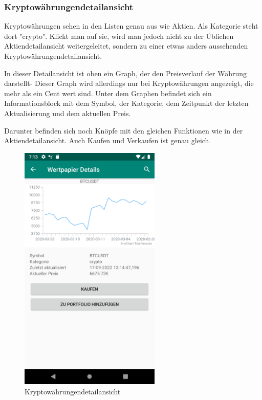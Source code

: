 \documentclass[10pt]{scrartcl}
\begin{document}
\subsubsection{Kryptowährungendetailansicht}

Kryptowährungen sehen in den Listen genau aus wie Aktien. Als Kategorie steht dort "crypto". Klickt man auf sie, wird man jedoch nicht zu der Üblichen Aktiendetailansicht weitergeleitet, sondern zu einer etwas anders aussehenden Kryptowährungendetailansicht.

In dieser Detailansicht ist oben ein Graph, der den Preisverlauf der Währung darstellt- Dieser Graph wird allerdings nur bei Kryptowährungen angezeigt, die mehr als ein Cent wert sind. Unter dem Graphen befindet sich ein Informationsblock mit dem Symbol, der Kategorie, dem Zeitpunkt der letzten Aktualisierung und dem aktuellen Preis.

Darunter befinden sich noch Knöpfe mit den gleichen Funktionen wie in der Aktiendetailansicht. Auch Kaufen und Verkaufen ist genau gleich.

\begin{figure}[H]
	\centering
	\includegraphics[width=0.6\textwidth]{Bilder/Applikation/krypto.png}
	\caption{Kryptowährungendetailansicht}
\end{figure}
\end{document}
